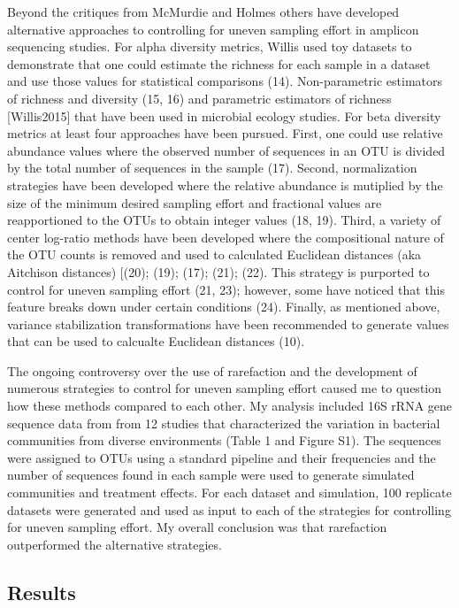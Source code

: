 \documentclass[
]{article}
\begin{document}
Beyond the critiques from McMurdie and Holmes others have developed
alternative approaches to controlling for uneven sampling effort in
amplicon sequencing studies. For alpha diversity metrics, Willis used
toy datasets to demonstrate that one could estimate the richness for
each sample in a dataset and use those values for statistical
comparisons (14). Non-parametric estimators of richness and diversity
(15, 16) and parametric estimators of richness {[}Willis2015{]} that
have been used in microbial ecology studies. For beta diversity metrics
at least four approaches have been pursued. First, one could use
relative abundance values where the observed number of sequences in an
OTU is divided by the total number of sequences in the sample (17).
Second, normalization strategies have been developed where the relative
abundance is mutiplied by the size of the minimum desired sampling
effort and fractional values are reapportioned to the OTUs to obtain
integer values (18, 19). Third, a variety of center log-ratio methods
have been developed where the compositional nature of the OTU counts is
removed and used to calculated Euclidean distances (aka Aitchison
distances) {[}(20); (19); (17); (21); (22). This strategy is purported
to control for uneven sampling effort (21, 23); however, some have
noticed that this feature breaks down under certain conditions (24).
Finally, as mentioned above, variance stabilization transformations have
been recommended to generate values that can be used to calcualte
Euclidean distances (10).

The ongoing controversy over the use of rarefaction and the development
of numerous strategies to control for uneven sampling effort caused me
to question how these methods compared to each other. My analysis
included 16S rRNA gene sequence data from from 12 studies that
characterized the variation in bacterial communities from diverse
environments (Table 1 and Figure S1). The sequences were assigned to
OTUs using a standard pipeline and their frequencies and the number of
sequences found in each sample were used to generate simulated
communities and treatment effects. For each dataset and simulation, 100
replicate datasets were generated and used as input to each of the
strategies for controlling for uneven sampling effort. My overall
conclusion was that rarefaction outperformed the alternative strategies.

\hypertarget{results}{%
\subsection{Results}\label{results}}
\end{document}
